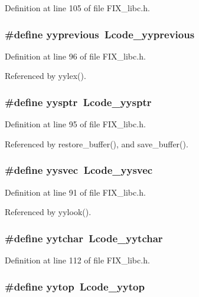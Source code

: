 Definition at line 105 of file FIX\_\-libc.h.
\subsubsection{\setlength{\rightskip}{0pt plus 5cm}\#define \bf{yyprevious}~Lcode\_\-yyprevious}\label{FIX__libc_8h_97d266fb812e14e5e288d6eced940adc}




Definition at line 96 of file FIX\_\-libc.h.

Referenced by yylex().
\subsubsection{\setlength{\rightskip}{0pt plus 5cm}\#define \bf{yysptr}~Lcode\_\-yysptr}\label{FIX__libc_8h_8984e26ee0525a00f797b720085bdb92}




Definition at line 95 of file FIX\_\-libc.h.

Referenced by restore\_\-buffer(), and save\_\-buffer().
\subsubsection{\setlength{\rightskip}{0pt plus 5cm}\#define \bf{yysvec}~Lcode\_\-yysvec}\label{FIX__libc_8h_e800e78dfdbb5677f1bb9c3c957cf1fe}




Definition at line 91 of file FIX\_\-libc.h.

Referenced by yylook().
\subsubsection{\setlength{\rightskip}{0pt plus 5cm}\#define \bf{yytchar}~Lcode\_\-yytchar}\label{FIX__libc_8h_10c4fa1591f77b5cbf357d3acaf41220}




Definition at line 112 of file FIX\_\-libc.h.
\subsubsection{\setlength{\rightskip}{0pt plus 5cm}\#define \bf{yytop}~Lcode\_\-yytop}\label{FIX__libc_8h_21b4e3db030985a6942163d993b4088e}




